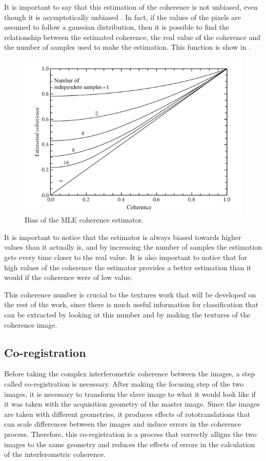 It is important to say that this estimation of the coherence is not unbiased, even though it is asymptotically unbiased \cite{Bamler}. In fact, if the values of the pixels are assumed to follow a gaussian distribution, then it is possible to find the relationship between the estimated coherence, the real value of the coherence and the number of samples used to make the estimation. This function is show in .

\begin{figure}[H]
    \centering
    \includegraphics[width=\linewidth]{Cap1/bias.png}
    \caption{Bias of the MLE coherence estimator. \cite{Bamler}}
    \label{fig:bias}
\end{figure}

It is important to notice that the estimator is always biased towards higher values than it actually is, and by increasing the number of samples the estimation gets every time closer to the real value. It is also important to notice that for high values of the coherence the estimator provides a better estimation than it would if the coherence were of low value. 

This coherence number is crucial to the textures work that will be developed on the rest of the work, since there is much useful information for classification that can be extracted by looking at this number and by making the textures of the coherence image.

\subsection{Co-registration}
Before taking the complex interferometric coherence between the images, a step called co-registration is necessary. After making the focusing step of the two images, it is necessary to transform the slave image to what it would look like if it was taken with the acquisition geometry of the master image. Since the images are taken with different geometries, it produces effects of rototranslations that can scale differences between the images and induce errors in the coherence process. Therefore, this co-registration is a process that correctly alligns the two images to the same geometry and reduces the effects of errors in the calculation of the interferometric coherence\cite{andreathesis}.

